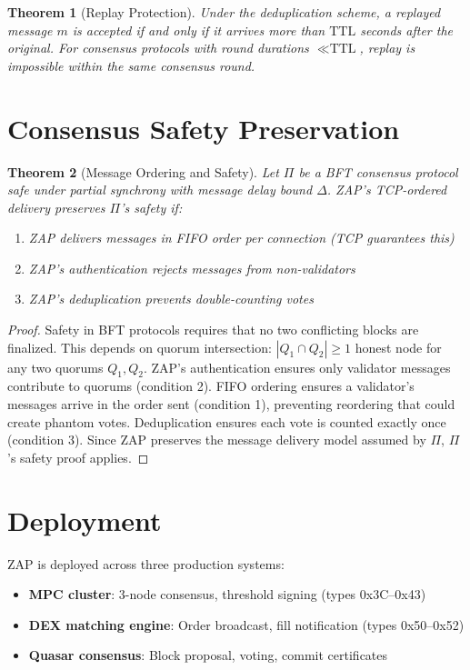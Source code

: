 \documentclass[11pt,letterpaper]{article}
\newtheorem{theorem}{Theorem}
\begin{document}
\begin{theorem}[Replay Protection]
Under the deduplication scheme, a replayed message $m$ is accepted if and only if it arrives more than $\text{TTL}$ seconds after the original. For consensus protocols with round durations $\ll \text{TTL}$, replay is impossible within the same consensus round.
\end{theorem}

\section{Consensus Safety Preservation}

\begin{theorem}[Message Ordering and Safety]
Let $\Pi$ be a BFT consensus protocol safe under partial synchrony with message delay bound $\Delta$. ZAP's TCP-ordered delivery preserves $\Pi$'s safety if:
\begin{enumerate}
    \item ZAP delivers messages in FIFO order per connection (TCP guarantees this)
    \item ZAP's authentication rejects messages from non-validators
    \item ZAP's deduplication prevents double-counting votes
\end{enumerate}
\end{theorem}

\begin{proof}
Safety in BFT protocols requires that no two conflicting blocks are finalized. This depends on quorum intersection: $|Q_1 \cap Q_2| \geq 1$ honest node for any two quorums $Q_1, Q_2$. ZAP's authentication ensures only validator messages contribute to quorums (condition 2). FIFO ordering ensures a validator's messages arrive in the order sent (condition 1), preventing reordering that could create phantom votes. Deduplication ensures each vote is counted exactly once (condition 3). Since ZAP preserves the message delivery model assumed by $\Pi$, $\Pi$'s safety proof applies.
\end{proof}

\section{Deployment}

ZAP is deployed across three production systems:
\begin{itemize}
    \item \textbf{MPC cluster}: 3-node consensus, threshold signing (types 0x3C--0x43)
    \item \textbf{DEX matching engine}: Order broadcast, fill notification (types 0x50--0x52)
    \item \textbf{Quasar consensus}: Block proposal, voting, commit certificates
\end{itemize}
\end{document}
